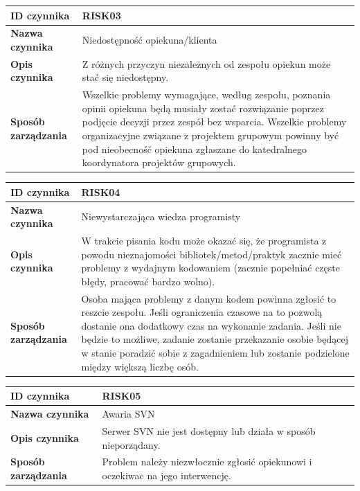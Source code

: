 \begin{center}
\begin{tabular}{|l|p{12cm}|}
\hline
\textbf{ID czynnika} &  RISK03 \tabularnewline \hline
\textbf{Nazwa czynnika} & Niedostępność opiekuna/klienta \tabularnewline \hline
\textbf{Opis czynnika} & Z różnych przyczyn niezależnych od zespołu opiekun może stać się niedostępny.  \tabularnewline \hline
\textbf{Sposób zarządzania} & Wszelkie problemy wymagające, według zespołu, poznania opinii opiekuna będą musiały zostać rozwiązanie poprzez podjęcie decyzji przez zespół bez wsparcia. Wszelkie problemy organizacyjne związane z projektem grupowym powinny być pod nieobecność opiekuna zgłaszane do katedralnego koordynatora projektów grupowych.     \tabularnewline \hline
\end{tabular}
\end{center}


\begin{center}
\begin{tabular}{|l|p{12cm}|}
\hline
\textbf{ID czynnika} &  RISK04 \tabularnewline \hline
\textbf{Nazwa czynnika} & Niewystarczająca wiedza programisty \tabularnewline \hline
\textbf{Opis czynnika} & W trakcie pisania kodu może okazać się, że programista z powodu nieznajomości bibliotek/metod/praktyk zacznie mieć problemy z wydajnym kodowaniem (zacznie popełniać częste błędy, pracować bardzo wolno).  \tabularnewline \hline
\textbf{Sposób zarządzania} & Osoba mająca problemy z danym kodem powinna zgłosić to reszcie zespołu. Jeśli ograniczenia czasowe na to pozwolą dostanie ona dodatkowy czas na wykonanie zadania. Jeśli nie będzie to możliwe, zadanie zostanie przekazanie osobie będącej w stanie poradzić sobie z zagadnieniem lub zostanie podzielone między większą liczbę osób. \tabularnewline \hline
\end{tabular}
\end{center}

\begin{center}
\begin{tabular}{|l|p{12cm}|}
\hline
\textbf{ID czynnika} &  RISK05 \tabularnewline \hline
\textbf{Nazwa czynnika} & Awaria SVN \tabularnewline \hline
\textbf{Opis czynnika} & Serwer SVN nie jest dostępny lub działa w sposób nieporządany. \tabularnewline \hline
\textbf{Sposób zarządzania} & Problem należy niezwłocznie zgłosić opiekunowi i oczekiwac na jego interwencję. \tabularnewline \hline
\end{tabular}
\end{center}



